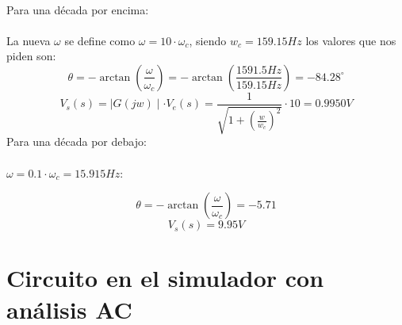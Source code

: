 \documentclass[11pt,letterpaper]{article}
\begin{document}
\\
Para una década por encima:\\
\\
La nueva $\omega$ se define como $\omega=10\cdot \omega_c$, siendo $w_c=159.15 Hz$ los valores que nos piden son:
\begin{equation}
	\boxed{\theta= -\arctan\left( \frac{\omega}{\omega_c} \right) = -\arctan\left( \frac{1591.5 Hz}{159.15 Hz} \right) =-84.28^\circ}
\end{equation}
\begin{equation}
\boxed{V_s\left( s \right) = \mid G(jw) \mid \cdot V_e(s)=\frac{1}{\sqrt{1+\left( \frac{w}{w_c} \right)^2}} \cdot 10= 0.9950 V}
\end{equation}
Para una década por debajo:\\
\\
$\omega=0.1\cdot \omega_c= 15.915Hz$:

\begin{equation}
	\boxed{\theta=-\arctan \left( \frac{\omega}{\omega_c} \right) =-5.71}
\end{equation}
 \begin{equation}
	 \boxed{V_s\left( s \right) = 9.95 V}
\end{equation}

\section{Circuito en el simulador con análisis AC}%
\label{sec:Circuito en el simulador con análisis AC}
\end{document}
